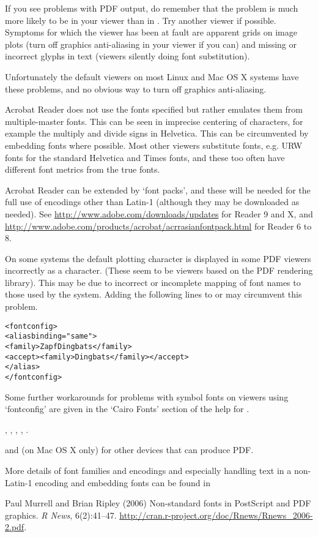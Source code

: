 \begin{Note}\relax
If you see problems with PDF output, do remember that the problem is
much more likely to be in your viewer than in \R{}.  Try another
viewer if possible.  Symptoms for which the viewer has been at fault
are apparent grids on image plots (turn off graphics anti-aliasing
in your viewer if you can) and missing or incorrect glyphs in text
(viewers silently doing font substitution).

Unfortunately the default viewers on most Linux and Mac OS X systems
have these problems, and no obvious way to turn off graphics anti-aliasing.

Acrobat Reader does not use the fonts specified but rather emulates
them from multiple-master fonts.  This can be seen in imprecise
centering of characters, for example the multiply and divide signs in
Helvetica.  This can be circumvented by embedding fonts where
possible.  Most other viewers substitute fonts, e.g. URW fonts for the
standard Helvetica and Times fonts, and these too often have different
font metrics from the true fonts.

Acrobat Reader can be extended by `font packs', and these will
be needed for the full use of encodings other than Latin-1 (although
they may be downloaded as needed).  See
\url{http://www.adobe.com/downloads/updates} for Reader 9 and X, and
\url{http://www.adobe.com/products/acrobat/acrrasianfontpack.html} for
Reader 6 to 8.

On some systems the default plotting character  is
displayed in some PDF viewers incorrectly as a 
character.  (These seem to be viewers based on the  PDF
rendering library).  This may be due to incorrect or incomplete mapping
of font names to those used by the system.  Adding the following lines
to  or  may circumvent
this problem.
\begin{alltt}<fontconfig>    
<alias binding="same">
  <family>ZapfDingbats</family>
  <accept><family>Dingbats</family></accept>
</alias>
</fontconfig>  
\end{alltt}

Some further workarounds for problems with symbol fonts on
viewers using `fontconfig' are given in the `Cairo Fonts'
section of the help for .
\end{Note}
%
\begin{SeeAlso}\relax
{}, ,
,
,
.

 and (on Mac OS X only) 
for other devices that can produce PDF.

More details of font families and encodings and especially handling
text in a non-Latin-1 encoding and embedding fonts can be found in

Paul Murrell and Brian Ripley (2006) Non-standard fonts in PostScript
and PDF graphics. \emph{R News}, 6(2):41--47.
\url{http://cran.r-project.org/doc/Rnews/Rnews_2006-2.pdf}.
\end{SeeAlso}
